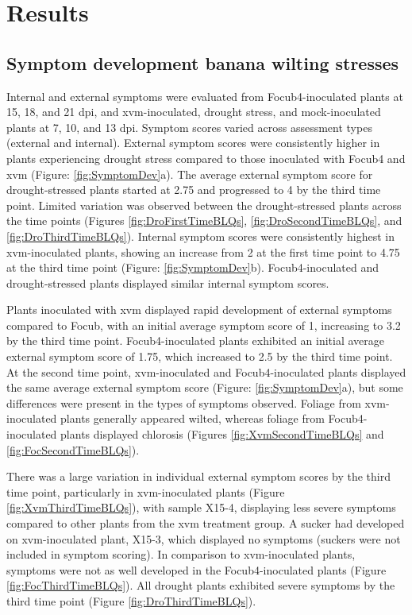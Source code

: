\newpage
\section{Results}

\subsection{Symptom development banana wilting stresses}

Internal and external symptoms were evaluated from \ac{Focub4}-inoculated plants at 15, 18, and 21 \ac{dpi}, and \ac{xvm}-inoculated, drought stress, and mock-inoculated plants at 7, 10, and 13 \ac{dpi}. Symptom scores varied across assessment types (external and internal). External symptom scores were consistently higher in plants experiencing drought stress compared to those inoculated with \ac{Focub4} and \ac{xvm} (Figure: \ref{fig:SymptomDev}a). The average external symptom score for drought-stressed plants started at 2.75 and progressed to 4 by the third time point. Limited variation was observed between the drought-stressed plants across the time points (Figures \ref{fig:DroFirstTimeBLQs},  \ref{fig:DroSecondTimeBLQs}, and \ref{fig:DroThirdTimeBLQs}). Internal symptom scores were consistently highest in \ac{xvm}-inoculated plants, showing an increase from 2 at the first time point to 4.75 at the third time point (Figure: \ref{fig:SymptomDev}b). \Ac{Focub4}-inoculated and drought-stressed plants displayed similar internal symptom scores.

Plants inoculated with \ac{xvm} displayed rapid development of external symptoms compared to \ac{Focub}, with an initial average symptom score of 1, increasing to 3.2 by the third time point. \ac{Focub4}-inoculated plants exhibited an initial average external symptom score of 1.75, which increased to 2.5 by the third time point. At the second time point, \ac{xvm}-inoculated and \ac{Focub4}-inoculated plants displayed the same average external symptom score (Figure: \ref{fig:SymptomDev}a), but some differences were present in the types of symptoms observed. Foliage from \ac{xvm}-inoculated plants generally appeared wilted, whereas foliage from \ac{Focub4}-inoculated plants displayed chlorosis (Figures \ref{fig:XvmSecondTimeBLQs} and \ref{fig:FocSecondTimeBLQs}).
 
There was a large variation in individual external symptom scores by the third time point, particularly in \ac{xvm}-inoculated plants (Figure \ref{fig:XvmThirdTimeBLQs}), with sample X15-4, displaying less severe symptoms compared to other plants from the \ac{xvm} treatment group. A sucker had developed on \ac{xvm}-inoculated plant, X15-3, which displayed no symptoms (suckers were not included in symptom scoring). In comparison to \ac{xvm}-inoculated plants, symptoms were not as well developed in the \ac{Focub4}-inoculated plants (Figure \ref{fig:FocThirdTimeBLQs}). All drought plants exhibited severe symptoms by the third time point (Figure \ref{fig:DroThirdTimeBLQs}).

